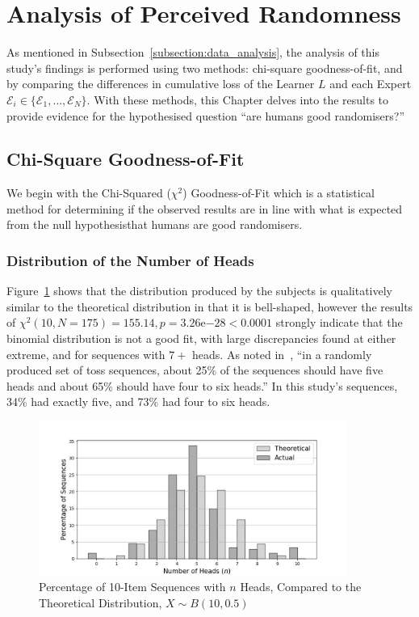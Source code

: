 \section{Analysis of Perceived Randomness}\label{section:analysis_of_perceived_randomness}
As mentioned in Subsection~\ref{subsection:data_analysis}, the analysis of this study's findings is performed using two methods: chi-square goodness-of-fit, and by comparing the differences in cumulative loss of the Learner $L$ and each Expert $\mathcal{E}_i \in \{\mathcal{E}_1,\ldots, \mathcal{E}_N\}$. With these methods, this Chapter delves into the results to provide evidence for the hypothesised question ``are humans good randomisers?'' 

\subsection{Chi-Square Goodness-of-Fit}\label{subsection:chi-square_goodness-of-fit}
We begin with the Chi-Squared ($\chi^2$) Goodness-of-Fit which is a statistical method for determining if the observed results are in line with what is expected from the null hypothesis\textemdash{}that humans are good randomisers.

\subsubsection{Distribution of the Number of Heads}
Figure~\ref{distribution_of_the_number_of_heads} shows that the distribution produced by the subjects is qualitatively similar to the theoretical distribution in that it is bell-shaped, however the results of $\chi^2(10, N=175) = 155.14, p=3.26\mathrm{e}{-28} < 0.0001$ strongly indicate that the binomial distribution is not a good fit, with large discrepancies found at either extreme, and for sequences with $7+$ heads. As noted in~\cite{nickerson:2009}, ``in a randomly produced set of toss sequences, about 25\% of the sequences should have five heads and about 65\% should have four to six heads.'' In this study's sequences, 34\% had exactly five, and 73\% had four to six heads.

\begin{figure}[h]
    \centering
    \includegraphics[width=0.9\textwidth]{images/combined_number_of_heads.jpg}
    \caption{Percentage of 10-Item Sequences with $n$ Heads, Compared to the Theoretical Distribution, $X \sim B(10, 0.5)$}
    \label{distribution_of_the_number_of_heads}
\end{figure}

